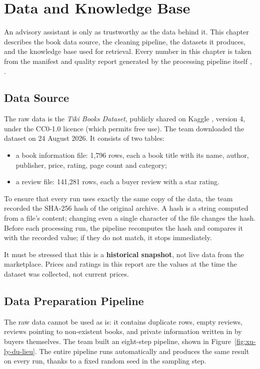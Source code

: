 \chapter{Data and Knowledge Base}
\label{ch:du-lieu}

An advisory assistant is only as trustworthy as the data behind it. This chapter describes the book data source, the cleaning pipeline, the datasets it produces, and the knowledge base used for retrieval. Every number in this chapter is taken from the manifest and quality report generated by the processing pipeline itself , .

\section{Data Source}

The raw data is the \emph{Tiki Books Dataset}, publicly shared on Kaggle , version 4, under the CC0-1.0 licence (which permits free use). The team downloaded the dataset on 24 August 2026. It consists of two tables:

\begin{itemize}
    \item a book information file: 1,796 rows, each a book title with its name, author, publisher, price, rating, page count and category;
    \item a review file: 141,281 rows, each a buyer review with a star rating.
\end{itemize}

To ensure that every run uses exactly the same copy of the data, the team recorded the SHA-256 hash of the original archive. A hash is a string computed from a file's content; changing even a single character of the file changes the hash. Before each processing run, the pipeline recomputes the hash and compares it with the recorded value; if they do not match, it stops immediately.

It must be stressed that this is a \textbf{historical snapshot}, not live data from the marketplace. Prices and ratings in this report are the values at the time the dataset was collected, not current prices.

\section{Data Preparation Pipeline}

The raw data cannot be used as is: it contains duplicate rows, empty reviews, reviews pointing to non-existent books, and private information written in by buyers themselves. The team built an eight-step pipeline, shown in Figure~\ref{fig:xu-ly-du-lieu}. The entire pipeline runs automatically and produces the same result on every run, thanks to a fixed random seed in the sampling step.

